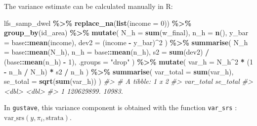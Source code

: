 \documentclass[
]{article}
\newenvironment{Shaded}{\begin{snugshade}}{\end{snugshade}}
\newcommand{\AttributeTok}[1]{\textcolor[rgb]{0.13,0.29,0.53}{#1}}
\newcommand{\CommentTok}[1]{\textcolor[rgb]{0.56,0.35,0.01}{\textit{#1}}}
\newcommand{\DecValTok}[1]{\textcolor[rgb]{0.00,0.00,0.81}{#1}}
\newcommand{\FunctionTok}[1]{\textcolor[rgb]{0.13,0.29,0.53}{\textbf{#1}}}
\newcommand{\NormalTok}[1]{#1}
\newcommand{\SpecialCharTok}[1]{\textcolor[rgb]{0.81,0.36,0.00}{\textbf{#1}}}
\newcommand{\StringTok}[1]{\textcolor[rgb]{0.31,0.60,0.02}{#1}}
\begin{document}
The variance estimate can be calculated manually in R:

\begin{Shaded}
\begin{Highlighting}[]
\NormalTok{lfs\_samp\_dwel }\SpecialCharTok{\%\textgreater{}\%}
  \FunctionTok{replace\_na}\NormalTok{(}\FunctionTok{list}\NormalTok{(}\AttributeTok{income =} \DecValTok{0}\NormalTok{)) }\SpecialCharTok{\%\textgreater{}\%}
  \FunctionTok{group\_by}\NormalTok{(id\_area) }\SpecialCharTok{\%\textgreater{}\%}
  \FunctionTok{mutate}\NormalTok{(}
    \AttributeTok{N\_h   =} \FunctionTok{sum}\NormalTok{(w\_final),}
    \AttributeTok{n\_h   =} \FunctionTok{n}\NormalTok{(),}
    \AttributeTok{y\_bar =}\NormalTok{ base}\SpecialCharTok{::}\FunctionTok{mean}\NormalTok{(income),}
    \AttributeTok{dev2  =}\NormalTok{ (income }\SpecialCharTok{{-}}\NormalTok{ y\_bar)}\SpecialCharTok{\^{}}\DecValTok{2}
\NormalTok{  ) }\SpecialCharTok{\%\textgreater{}\%}
  \FunctionTok{summarise}\NormalTok{(}
    \AttributeTok{N\_h =}\NormalTok{ base}\SpecialCharTok{::}\FunctionTok{mean}\NormalTok{(N\_h),}
    \AttributeTok{n\_h =}\NormalTok{ base}\SpecialCharTok{::}\FunctionTok{mean}\NormalTok{(n\_h),}
    \AttributeTok{s2  =} \FunctionTok{sum}\NormalTok{(dev2) }\SpecialCharTok{/}\NormalTok{ (base}\SpecialCharTok{::}\FunctionTok{mean}\NormalTok{(n\_h) }\SpecialCharTok{{-}} \DecValTok{1}\NormalTok{),}
    \AttributeTok{.groups =} \StringTok{"drop"}
\NormalTok{  ) }\SpecialCharTok{\%\textgreater{}\%}
  \FunctionTok{mutate}\NormalTok{(}
    \AttributeTok{var\_h =}\NormalTok{ N\_h}\SpecialCharTok{\^{}}\DecValTok{2} \SpecialCharTok{*}\NormalTok{ (}\DecValTok{1} \SpecialCharTok{{-}}\NormalTok{ n\_h }\SpecialCharTok{/}\NormalTok{ N\_h) }\SpecialCharTok{*}\NormalTok{ s2 }\SpecialCharTok{/}\NormalTok{ n\_h}
\NormalTok{  ) }\SpecialCharTok{\%\textgreater{}\%}
  \FunctionTok{summarise}\NormalTok{(}
    \AttributeTok{var\_total =} \FunctionTok{sum}\NormalTok{(var\_h),}
    \AttributeTok{se\_total  =} \FunctionTok{sqrt}\NormalTok{(}\FunctionTok{sum}\NormalTok{(var\_h))}
\NormalTok{  )}
\CommentTok{\#\textgreater{} \# A tibble: 1 x 2}
\CommentTok{\#\textgreater{}    var\_total se\_total}
\CommentTok{\#\textgreater{}        \textless{}dbl\textgreater{}    \textless{}dbl\textgreater{}}
\CommentTok{\#\textgreater{} 1 120629899.   10983.}
\end{Highlighting}
\end{Shaded}

In \texttt{gustave}, this variance component is obtained with the
function \texttt{var\_srs} : \(\text{var\_srs}(y,\pi_i,\text{strata})\).
\end{document}
